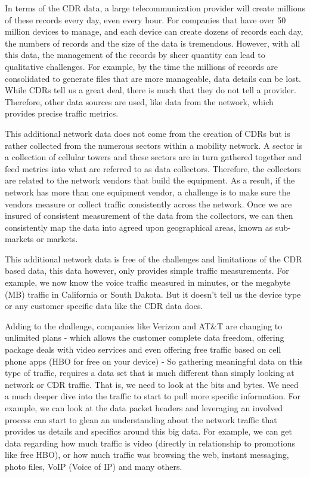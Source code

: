 \documentclass[sigconf]{acmart}
\begin{document}
In terms of the CDR data, a large telecommunication provider will create millions of these records every day, even every hour.  For companies that have over 50 million devices to manage, and each device can create dozens of records each day, the numbers of records and the size of the data is tremendous.  However,  with all this data, the management of the records by sheer quantity can lead to qualitative challenges.  For example, by the time the millions of records are consolidated to generate files that are more manageable, data details can be lost.   While CDRs tell us a great deal, there is much that they do not tell a provider.  Therefore, other data sources are used, like data from the network, which provides precise traffic metrics.

This additional network data does not come from the creation of CDRs but is rather collected from the numerous sectors within a mobility network.  A sector is a collection of cellular towers and these sectors are in turn gathered together and feed metrics into what are referred to as data collectors.  Therefore, the collectors are related to the network vendors that build the equipment.  As a result, if the network has more than one equipment vendor, a challenge is to make sure the vendors measure or collect traffic consistently across the network.  Once we are insured of consistent measurement of the data from the collectors, we can then consistently map the data into agreed upon geographical areas, known as sub-markets or markets.  

This additional network data is free of the challenges and limitations of the CDR based data, this data however, only provides simple traffic measurements.  For example, we now know the voice traffic measured in minutes, or the megabyte (MB) traffic in California or South Dakota.  But it doesn't tell us the device type or any customer specific data like the CDR data does.  

Adding to the challenge, companies like Verizon and AT\&T are changing to unlimited plans - which allows the customer complete data freedom, offering package deals with video services and even offering free traffic based on cell phone apps (HBO for free on your device) - So gathering meaningful data on this type of traffic, requires a data set that is much different than simply looking at network or CDR traffic. That is, we need to look at the bits and bytes. We need a much deeper dive into the traffic to start to pull more specific information.   For example, we can look at the data packet headers and leveraging an involved process can start to glean an understanding about the network traffic that provides us details and specifics around this big data.  For example, we can get data regarding how much traffic is video (directly in relationship to promotions like free HBO), or how much traffic was browsing the web, instant messaging, photo files, VoIP (Voice of IP) and many others.  
\end{document}
